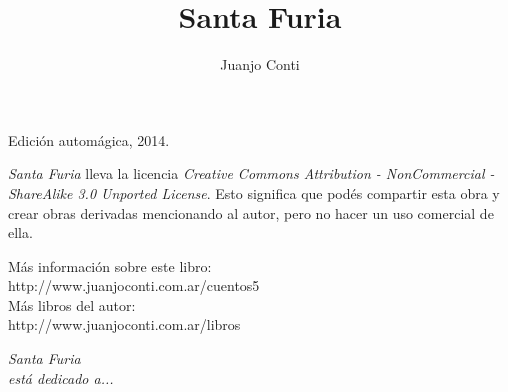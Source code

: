 \documentclass[12pt,twoside,openright,a5paper]{book}
\title{Santa Furia}
\author{Juanjo Conti}
\date{}
\begin{document}
\pagestyle{plain}

\maketitle

\cleardoublepage

\thispagestyle{empty}
\noindent
Edición automágica, 2014.\\

\vspace{0.5cm}

\noindent
\emph{Santa Furia} lleva la licencia 
\emph{Creative Commons Attribution - NonCommercial - ShareAlike 3.0 Unported License}.
Esto significa que podés compartir esta obra y crear obras derivadas
mencionando al autor, pero no ha\-cer un uso comercial de ella.

\vfill

\noindent
Más información sobre este libro:\\
http://www.juanjoconti.com.ar/cuentos5\\

\noindent
Más libros del autor:\\
http://www.juanjoconti.com.ar/libros

\cleardoublepage

\noindent
\begin{flushright}
\emph{
\emph{Santa Furia}\\
está dedicado a...
}
\end{flushright}

\cleardoublepage

\renewcommand*\contentsname{Índice}

\tableofcontents

 
 
 
 
 
 
 
 
 
 
 
\end{document}
